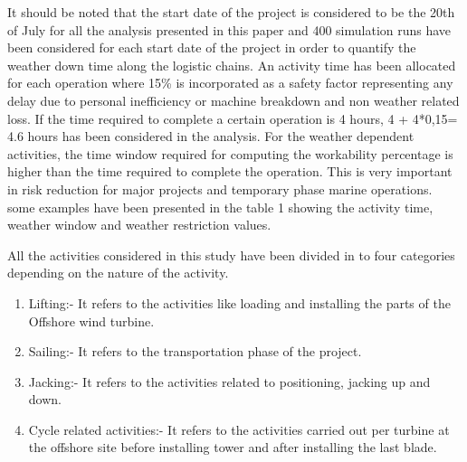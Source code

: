 It should be noted that the start date of the project is considered to be the 20th of July for all the analysis presented in this paper and 400 simulation runs have been considered for each start date of the project in order to quantify the weather down time along the logistic chains. An activity time has been allocated for each operation where 15\%  is incorporated as a safety factor representing any delay due to personal inefficiency or machine breakdown and non weather related loss. If the time required to complete a certain operation is 4 hours, 4 + 4*0,15= 4.6 hours has been considered in the analysis. For the weather dependent activities, the time window required for computing the workability percentage is higher than the time required to complete the operation. This is very important  in risk reduction for major projects and temporary phase marine operations. some examples have been presented in the table 1 showing the activity time, weather window and weather restriction values. 

All the activities considered in this study have been divided in to four categories depending on the nature of the activity. 
\begin{enumerate}
\item
Lifting:- It refers to the activities like loading and installing the parts of the Offshore wind turbine.
\item 
Sailing:- It refers to the transportation phase of the project.
\item 
Jacking:- It refers to the activities related to positioning, jacking up and down.
\item
Cycle related activities:- It refers to the activities carried out per turbine at the offshore site before installing tower and after installing the last blade. 
\end{enumerate}



